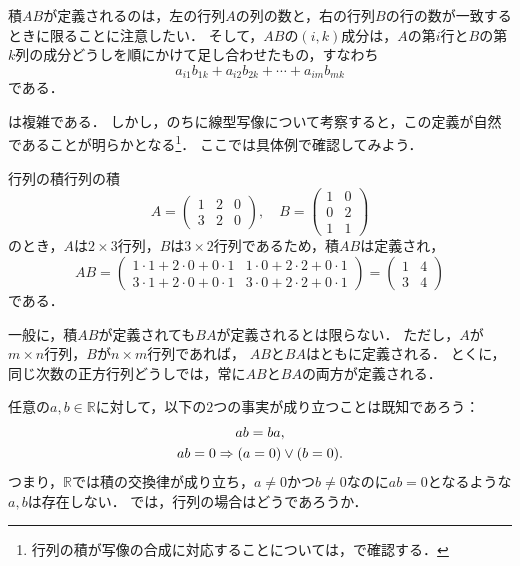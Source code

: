 積$AB$が定義されるのは，左の行列$A$の列の数と，右の行列$B$の行の数が一致するときに限ることに注意したい．
そして，$AB$の$(i, k)$成分は，$A$の第$i$行と$B$の第$k$列の成分どうしを順にかけて足し合わせたもの，すなわち
\[
  a_{i1}b_{1k} + a_{i2}b_{2k} + \cdots + a_{im}b_{mk}
\]
である．

は複雑である．
しかし，のちに線型写像について考察すると，この定義が自然であることが明らかとなる\footnote{行列の積が写像の合成に対応することについては，で確認する．}．
ここでは具体例で確認してみよう．

\begin{example}{行列の積}{行列の積}
  \[
    A = \begin{pmatrix} 1 & 2 & 0 \\ 3 & 2 & 0 \end{pmatrix}, \quad
    B = \begin{pmatrix} 1 & 0 \\ 0 & 2 \\ 1 & 1 \end{pmatrix}
  \]
  のとき，$A$は$2 \times 3$行列，$B$は$3 \times 2$行列であるため，積$AB$は定義され，
  \[
    AB =
    \begin{pmatrix}
      1 \cdot 1 + 2 \cdot 0 + 0 \cdot 1 & 1 \cdot 0 + 2 \cdot 2 + 0 \cdot 1 \\
      3 \cdot 1 + 2 \cdot 0 + 0 \cdot 1 & 3 \cdot 0 + 2 \cdot 2 + 0 \cdot 1
    \end{pmatrix}
    =
    \begin{pmatrix}
      1 & 4 \\
      3 & 4
    \end{pmatrix}
  \]
  である．
\end{example}

一般に，積$AB$が定義されても$BA$が定義されるとは限らない．
ただし，$A$が$m\times n$行列，$B$が$n\times m$行列であれば，
$AB$と$BA$はともに定義される．
とくに，同じ次数の正方行列どうしでは，常に$AB$と$BA$の両方が定義される．

任意の$a, b \in \mathbb{R}$に対して，以下の$2$つの事実が成り立つことは既知であろう：
\begin{gather*}
  ab = ba, \\
  ab = 0 \mathrel{\Rightarrow} (a = 0) \lor (b = 0).
\end{gather*}
つまり，$\mathbb{R}$では積の交換律が成り立ち，$a \ne 0$かつ$b \ne 0$なのに$ab = 0$となるような$a, b$は存在しない．
では，行列の場合はどうであろうか．

